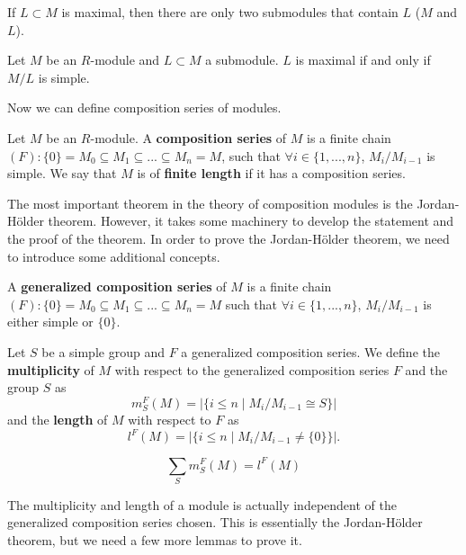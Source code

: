\documentclass[12pt, a4paper, titlepage]{report}
\begin{document}
\begin{rem}
  If $L \subset M$ is maximal, then there are only two submodules that contain $L$ ($M$ and $L$).
\end{rem}

\begin{lem}
  Let $M$ be an $R$-module and $L \subset M$ a submodule. $L$ is maximal if and only if $M/L$ is simple.
\end{lem}

Now we can define composition series of modules.

\begin{defn}
  Let $M$ be an $R$-module. A \textbf{composition series} of $M$ is a finite chain $(F) : \{0\} = M_0 \subseteq M_1 \subseteq ... \subseteq M_n = M$,
  such that $\forall i \in \{1, ..., n\}$, $M_i / M_{i-1}$ is simple. We say that $M$ is of \textbf{finite length} if it has a composition series.
\end{defn}

The most important theorem in the theory of composition modules is the Jordan-H\"{o}lder theorem. However, it takes some machinery to develop the
statement and the proof of the theorem. In order to prove the Jordan-H\"{o}lder theorem, we need to introduce some additional concepts.

\begin{defn}
  A \textbf{generalized composition series} of $M$ is a finite chain $(F) : \{0\} = M_0 \subseteq M_1 \subseteq ... \subseteq M_n = M$ such that
  $\forall i \in \{1, ..., n\}$, $M_i / M_{i-1}$ is either simple or $\{0\}$.

  Let $S$ be a simple group and $F$ a generalized composition series. We define the \textbf{multiplicity} of $M$ with respect to the generalized
  composition series $F$ and the group $S$ as
  \[
    m^F_S(M) = \big| \big\{ i \leq n \mid M_i/M_{i-1} \cong S \big\} \big|
  \]
  and the \textbf{length} of $M$ with respect to $F$ as
  \[
    l^F(M) = \big| \big\{ i \leq n \mid M_i / M_{i-1} \neq \{0\} \big\} \big|.
  \]
\end{defn}

\begin{rem}
  \[
    \sum_{S} m^F_S(M) = l^F(M)
  \]
\end{rem}

The multiplicity and length of a module is actually independent of the generalized composition series chosen. This is essentially the Jordan-H\"{o}lder
theorem, but we need a few more lemmas to prove it.
\end{document}
